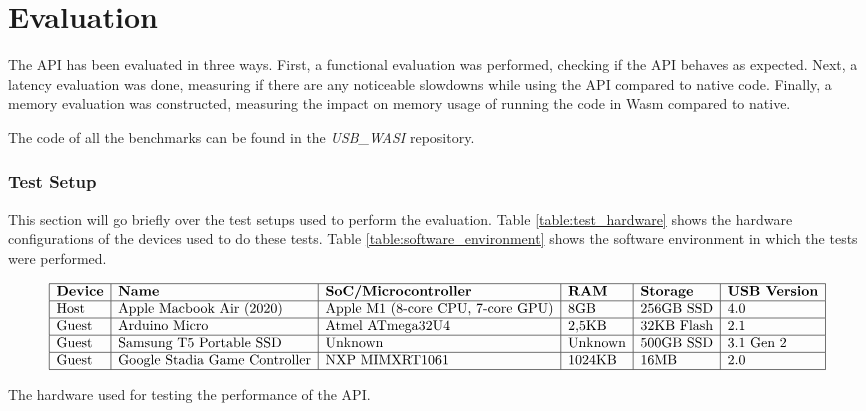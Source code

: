 \chapter{Evaluation}
\label{chapter:evaluation}

The \acrshort{API} has been evaluated in three ways. First, a functional evaluation was performed, checking if the \acrshort{API} behaves as expected. Next, a latency evaluation was done, measuring if there are any noticeable slowdowns while using the \acrshort{API} compared to native code. Finally, a memory evaluation was constructed, measuring the impact on memory usage of running the code in \acrshort{Wasm} compared to native.

The code of all the benchmarks can be found in the \textit{USB\_WASI} \cite{usb_wasi_impl} repository.

\subsection{Test Setup}

This section will go briefly over the test setups used to perform the evaluation.
Table \ref{table:test_hardware} shows the hardware configurations of the devices used to do these tests. Table \ref{table:software_environment} shows the software environment in which the tests were performed.

\begin{table}[H]
\[
\begin{array}{|l|l|l|l|l|l|}
\hline
\textbf{Device} & \textbf{Name} & \textbf{SoC/Microcontroller} & \textbf{RAM} & \textbf{Storage} & \textbf{USB Version} \\
\hline
\text{Host} & \text{Apple Macbook Air (2020)} & \text{Apple M1 (8-core CPU, 7-core GPU)} & \text{8GB} & \text{256GB SSD} & \text{4.0} \\

\hline
\text{Guest} & \text{Arduino Micro} & \text{Atmel ATmega32U4} & \text{2,5KB} & \text{32KB Flash} & \text{2.1} \\

\hline
\text{Guest} & \text{Samsung T5 Portable SSD} & \text{Unknown} & \text{Unknown} & \text{500GB SSD} & \text{3.1 Gen 2} \\
\hline
\text{Guest} & \text{Google Stadia Game Controller} & \text{NXP MIMXRT1061} & \text{1024KB} & \text{16MB} & \text{2.0} \\
\hline
\end{array}
\]
\caption{The hardware used for testing the performance of the API.}
\label{table:test_hardware}
\end{table}

